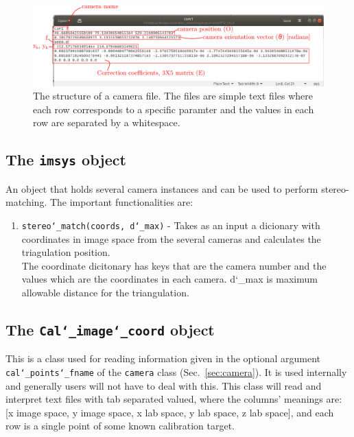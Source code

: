 \documentclass[10pt,a4paper]{article}
\begin{document}
\begin{figure}
	\centering
	\includegraphics[width=\textwidth]{camera_files.pdf}
	\caption{The structure of a camera file. The files are simple text files where each row corresponds to a specific paramter and the values in each row are separated by a whitespace. \label{fig:camfiles}}
\end{figure}








\subsection{The \texttt{imsys} object}


An object that holds several camera instances and can be used to perform stereo-matching. The important functionalities are:


\begin{enumerate}
	\item \texttt{stereo\char`_match(coords, d\char`_max)} - Takes as an input a dicionary with coordinates in image space from the several cameras and calculates the triagulation position. \\ The coordinate dicitonary has keys that are the camera number and the values which are the coordinates in each camera. d\char`_max is maximum allowable distance for the triangulation.
	
\end{enumerate}








\subsection{The \texttt{Cal\char`_image\char`_coord} object}\label{sec:calpointreader}

This is a class used for reading information given in the optional argument \texttt{cal\char`_points\char`_fname} of the \texttt{camera} class (Sec.~\ref{sec:camera}). It is used internally and generally users will not have to deal with this. This class will read and interpret text files with tab separated valued, where the columns' meanings are: [x image space, y image space, x lab space, y lab space, z lab space], and each row is a single point of some known calibration target.
\end{document}
